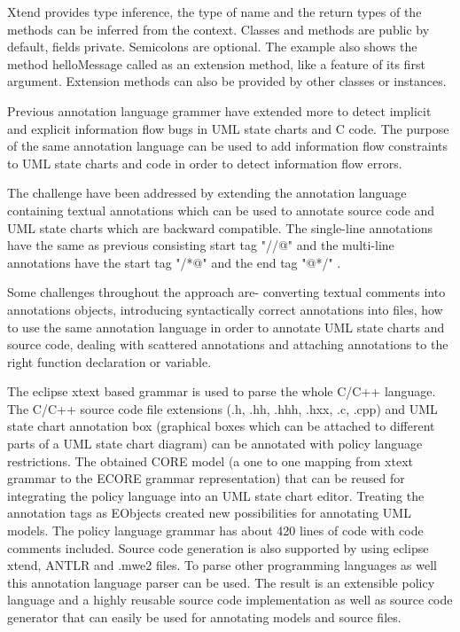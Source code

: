 Xtend provides type inference, the type of name and the return types of the methods can be inferred from the context. Classes and methods are public by default, fields private. Semicolons are optional. The example also shows the method helloMessage called as an extension method, like a feature of its first argument. Extension methods can also be provided by other classes or instances.


Previous annotation language grammer have extended more
to detect implicit and explicit information flow bugs in UML
state charts and C code. The purpose of the same annotation language
can be used to add information flow constraints to UML state
charts and code in order to detect information flow errors.

The challenge have been addressed by extending the annotation language containing textual annotations which can be used to annotate source code and UML state charts which are backward compatible. The single-line annotations have the same as previous consisting start tag "//@" and the multi-line annotations have the start tag "/*@" and the end tag "@*/" .

Some challenges throughout the approach are- converting textual
comments into annotations objects, introducing syntactically
correct annotations into files, how to use the same annotation
language in order to annotate UML state charts and source
code, dealing with scattered annotations and attaching annotations to the right function declaration or variable.

The eclipse xtext based grammar is used to parse the whole C/C++ language. The C/C++ source code file extensions (.h, .hh, .hhh, .hxx, .c, .cpp) and UML state chart annotation box (graphical boxes
which can be attached to different parts of a UML state chart diagram) can be annotated with policy language restrictions. The obtained CORE model (a one to one mapping from xtext grammar to the ECORE grammar representation) that can be reused for integrating the policy language into an UML state chart editor. Treating the annotation tags as EObjects created new possibilities for annotating
UML models. The policy language grammar has about 420 lines of code with code comments included. Source code generation is also supported by using
eclipse xtend, ANTLR and .mwe2 files. To parse other programming languages as well this annotation language parser can be used. The result is an extensible policy language and a highly reusable source code implementation as well as source code generator that can easily be used for annotating models and source files.

